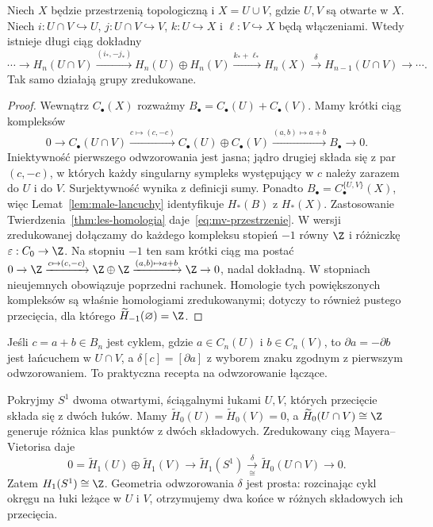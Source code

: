 \begin{twierdzenie}
\label{thm:mv-przestrzenie}
Niech $X$ będzie przestrzenią topologiczną
i $X=U\cup V$, gdzie $U,V$ są otwarte w $X$.
Niech $i:U\cap V\hookrightarrow U$,
$j:U\cap V\hookrightarrow V$,
$k:U\hookrightarrow X$ i $\ell:V\hookrightarrow X$
będą włączeniami. Wtedy istnieje
długi ciąg dokładny
\begin{equation}\label{eq:mv-przestrzenie}
 \cdots\to H_n(U\cap V)
 \xrightarrow{(i_*,-j_*)}
 H_n(U)\oplus H_n(V)
 \xrightarrow{k_*+\ell_*}H_n(X)
 \xrightarrow{\delta}H_{n-1}(U\cap V)\to\cdots.
\end{equation}
Tak samo działają grupy zredukowane.
\end{twierdzenie}
\begin{proof}
Wewnątrz $C_\bullet(X)$ rozważmy
$B_\bullet=C_\bullet(U)+C_\bullet(V)$.
Mamy krótki ciąg kompleksów
\[
 0\to C_\bullet(U\cap V)
 \xrightarrow{c\mapsto(c,-c)}
 C_\bullet(U)\oplus C_\bullet(V)
 \xrightarrow{(a,b)\mapsto a+b}
 B_\bullet\to0.
\]
Iniektywność pierwszego odwzorowania jest jasna;
jądro drugiej składa się z par
$(c,-c)$, w których każdy singularny
sympleks występujący w $c$ należy
zarazem do $U$ i do $V$.
Surjektywność wynika z definicji sumy.
Ponadto $B_\bullet=C_\bullet^{\{U,V\}}(X)$,
więc Lemat~\ref{lem:male-lancuchy}
identyfikuje $H_*(B)$ z $H_*(X)$.
Zastosowanie Twierdzenia~\ref{thm:les-homologia}
daje~\eqref{eq:mv-przestrzenie}.
W wersji zredukowanej dołączamy
do każdego kompleksu stopień $-1$
równy $\Z$ i różniczkę
$\varepsilon:C_0\to\Z$.
Na stopniu $-1$ ten sam krótki
ciąg ma postać
$0\to\Z\xrightarrow{c\mapsto(c,-c)}
\Z\oplus\Z\xrightarrow{(a,b)\mapsto a+b}
\Z\to0$, nadal dokładną.
W stopniach nieujemnych
obowiązuje poprzedni rachunek.
Homologie tych powiększonych
kompleksów są właśnie
homologiami zredukowanymi;
dotyczy to również pustego
przecięcia, dla którego
$\widetilde H_{-1}(\varnothing)=\Z$.
\end{proof}

Jeśli $c=a+b\in B_n$ jest cyklem,
gdzie $a\in C_n(U)$ i $b\in C_n(V)$,
to $\partial a=-\partial b$ jest
łańcuchem w $U\cap V$, a
$\delta[c]=[\partial a]$ z wyborem
znaku zgodnym z pierwszym odwzorowaniem.
To praktyczna recepta na odwzorowanie łączące.

\begin{przyklad}
\label{prz:mv-okrag}
Pokryjmy $S^1$ dwoma otwartymi,
ściągalnymi łukami $U,V$, których
przecięcie składa się z dwóch
łuków. Mamy
$\widetilde H_0(U)=
\widetilde H_0(V)=0$,
a $\widetilde H_0(U\cap V)\cong\Z$
generuje różnica klas punktów
z dwóch składowych.
Zredukowany ciąg
Mayera--Vietorisa daje
\[
 0=\widetilde H_1(U)\oplus
 \widetilde H_1(V)\to
 \widetilde H_1(S^1)
 \xrightarrow[\cong]{\delta}
 \widetilde H_0(U\cap V)\to0.
\]
Zatem $H_1(S^1)\cong\Z$.
Geometria odwzorowania $\delta$ jest prosta:
rozcinając cykl okręgu na łuki
leżące w $U$ i $V$, otrzymujemy
dwa końce w różnych składowych
ich przecięcia.
\end{przyklad}

